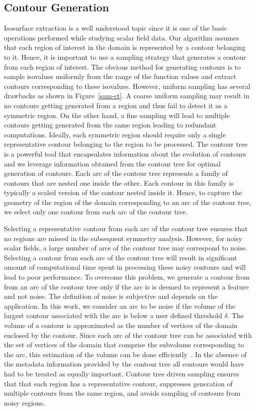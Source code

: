 \documentclass[review,journal]{vgtc}         %
\begin{document}
\subsection{Contour Generation}\label{congen}
Isosurface extraction is a well understood topic since it is one of the basic
operations performed while studying scalar field data. Our algorithm assumes that
each region of interest in the domain is represented by a contour belonging to it.
Hence, it is important to use a sampling strategy that generates a contour from each
region of interest. The obvious method for generating contours is 
to sample isovalues uniformly from the range of the function values and extract contours 
corresponding to these isovalues. However, uniform sampling has several drawbacks as shown 
in Figure~\ref{sam-ct}. A coarse uniform sampling may result in no contours getting 
generated from a region and thus fail to detect it as a symmetric region. On the other hand, 
a fine sampling will lead to multiple contours getting generated from the same region 
leading to redundant computations. Ideally, each symmetric region should require only a single 
representative contour belonging to the region to be processed.
The contour tree is a powerful tool that encapsulates information about the evolution of contours 
and we leverage information obtained from the contour tree for optimal generation of contours. 
Each arc of the contour tree represents a family of contours that are nested one inside the other.
Each contour in this family is typically a scaled version of the contour nested inside it. 
Hence, to capture the geometry of the region of the domain corresponding to an arc of the contour tree, 
we select only one contour from each arc of the contour tree.

Selecting a representative contour from each arc of the contour tree ensures that no regions
are missed in the subsequent symmetry analysis. However, for noisy scalar fields, a large
number of arcs of the contour tree may correspond to noise. Selecting a contour from each
arc of the contour tree will result in significant amount of computational time spent in
processing these noisy contours and will lead to poor performance. To overcome this problem,
we generate a contour from from an arc of the contour tree only if the arc is is deemed to represent
a feature and not noise. The definition of noise is subjective and depends on the application.
In this work, we consider an arc to be noise if the volume of the 
largest contour associated with the arc is below a user defined threshold $\delta$. The volume of a
contour is approximated as the number of vertices of the domain enclosed by the contour. 
Since each arc of the contour tree can be associated with the set of vertices of the domain 
that comprise the subvolume corresponding to the arc, this estimation of the volume can be done 
efficiently~\cite{CarrSP10}. In the absence of the metadata information provided by the contour tree 
all contours would have had to be treated as equally important. Contour tree driven sampling ensures
that that each region has a representative contour, suppresses generation of multiple contours 
from the same region, and avoids sampling of contours from noisy regions.
\end{document}
